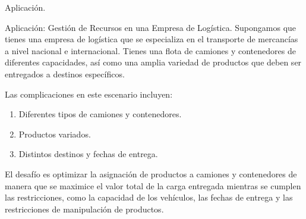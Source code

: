 \begin{frame}{Aplicación.}

\begin{block}{Aplicación: Gestión de Recursos en una Empresa de Logística.}
  Supongamos que tienes una empresa de logística que se especializa en el transporte de mercancías a nivel nacional e internacional. Tienes una flota de camiones y contenedores de diferentes capacidades, así como una amplia variedad de productos que deben ser entregados a destinos específicos.\newline

  Las complicaciones en este escenario incluyen:
  \begin{enumerate}
  \item Diferentes tipos de camiones y contenedores.
  \item Productos variados.
  \item Distintos destinos y fechas de entrega.
  \end{enumerate}
  
  El desafío es optimizar la asignación de productos a camiones y contenedores de manera que se maximice el valor total de la carga entregada mientras se cumplen las restricciones, como la capacidad de los vehículos, las fechas de entrega y las restricciones de manipulación de productos.
\end{block}
    
\end{frame}
